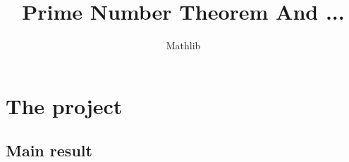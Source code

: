\documentclass{report}
\title{Prime Number Theorem And ...}
\author{Mathlib}
\theoremstyle{definition}
\begin{document}
\maketitle

\chapter{The project}

\section{Main result}


\end{document}
